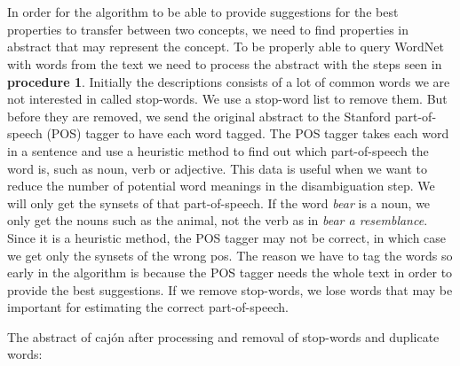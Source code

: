 \noindent{}
\\\\In order for the algorithm to be able to provide suggestions for the best properties to transfer between two concepts, we need to find properties in abstract that may represent the concept. To be properly able to query WordNet with words from the text we need to process the abstract with the steps seen in \textbf{procedure 1}. Initially the descriptions consists of a lot of common words we are not interested in called stop-words. We use a stop-word list to remove them. But before they are removed, we send the original abstract to the Stanford part-of-speech (POS) tagger to have each word tagged. The POS tagger takes each word in a sentence and use a heuristic method to find out which part-of-speech the word is, such as noun, verb or adjective. This data is useful when we want to reduce the number of potential word meanings in the disambiguation step. We will only get the synsets of that part-of-speech. If the word \emph{bear} is a noun, we only get the nouns such as the animal, not the verb as in \emph{bear a resemblance}. Since it is a heuristic method, the POS tagger may not be correct, in which case we get only the synsets of the wrong pos. The reason we have to tag the words so early in the algorithm is because the POS tagger needs the whole text in order to provide the best suggestions. If we remove stop-words, we lose words that may be important for estimating the correct part-of-speech. 

The abstract of cajón after processing and removal of stop-words and duplicate words:\\

\noindent{}


